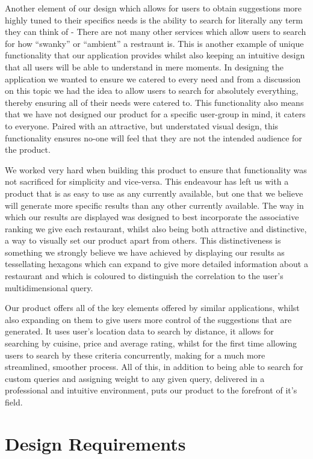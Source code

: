 \documentclass[10pt,a4paper]{article}
\begin{document}
Another element of our design which allows for users to obtain suggestions more highly tuned to their specifics needs is the ability to search for literally any term they can think of - There are not many other services which allow users to search for how “swanky” or “ambient” a restraunt is. This is another example of unique functionality that our application provides whilst also keeping an intuitive design that all users will be able to understand in mere moments. In designing the application we wanted to ensure we catered to every need and from a discussion on this topic we had the idea to allow users to search for absolutely everything, thereby ensuring all of their needs were catered to. This functionality also means that we have not designed our product for a specific user-group in mind, it caters to everyone. Paired with an attractive, but understated visual design, this functionality ensures no-one will feel that they are not the intended audience for the product.

We worked very hard when building this product to ensure that functionality was not sacrificed for simplicity and vice-versa. This endeavour has left us with a product that is as easy to use as any currently available, but one that we believe will generate more specific results than any other currently available. The way in which our results are displayed was designed to best incorporate the associative ranking we give each restaurant, whilst also being both attractive and distinctive, a way to visually set our product apart from others. This distinctiveness is something we strongly believe we have achieved by displaying our results as tessellating hexagons which can expand to give more detailed information about a restaurant and which is coloured to distinguish the correlation to the user’s multidimensional query.

Our product offers all of the key elements offered by similar applications, whilst also expanding on them to give users more control of the suggestions that are generated. It uses user’s location data to search by distance, it allows for searching by cuisine, price and average rating, whilst for the first time allowing users to search by these criteria concurrently, making for a much more streamlined, smoother process. All of this, in addition to being able to search for custom queries and assigning weight to any given query, delivered in a professional and intuitive environment, puts our product to the forefront of it’s field. 

\section*{Design Requirements}
\end{document}
